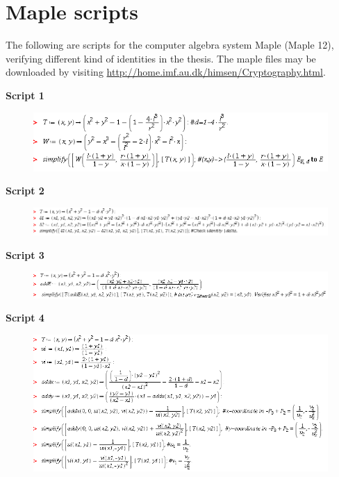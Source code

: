 \appendix
\chapter{Maple scripts}
\label{app:A}
The following are scripts for the computer algebra system Maple (Maple 12), verifying different kind of identities in the thesis. The maple files may be downloaded by visiting \url{http://home.imf.au.dk/himsen/Cryptography.html}. \newline

\noindent\textbf{Script 1}
\begin{figure}[htpl]
\includegraphics[scale=0.7]{script_maps_from_Edwards_to_elliptic.png}
\end{figure}

\noindent\textbf{Script 2} 
\begin{figure}[htpl]
\includegraphics[scale=0.72]{script_delta.png}
\end{figure}

\noindent\textbf{Script 3}
\begin{figure}[htpl]
\includegraphics[scale=0.75]{script_maps_to_Edwards_curve.png}
\end{figure}

\newpage
\noindent\textbf{Script 4}
\begin{figure}[htpl]
\includegraphics[scale=0.8]{script_verify_edwards_elliptic_addition.png}
\end{figure}




